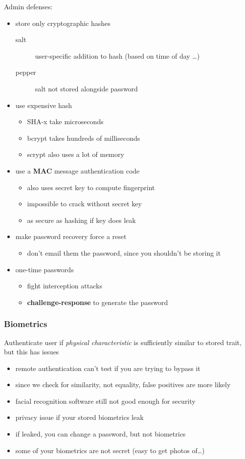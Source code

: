 \documentclass[]{article}
\theoremstyle{definition}
\begin{document}
	Admin defenses:
	\begin{itemize}
		\item store only cryptographic hashes
			\begin{description}
				\item[salt] user-specific addition to hash (based on time of day \dots)
				\item[pepper] salt not stored alongside password
			\end{description}
		\item use expensive hash
			\begin{itemize}
				\item SHA-x take microseconds
				\item bcrypt takes hundreds of milliseconds
				\item scrypt also uses a lot of memory
			\end{itemize}
		\item use a \textbf{MAC} message authentication code
			\begin{itemize}
				\item also uses secret key to compute fingerprint
				\item impossible to crack without secret key
				\item as secure as hashing if key does leak
			\end{itemize}
		\item make password recovery force a reset
			\begin{itemize}
				\item don't email them the password, since you shouldn't be storing it
			\end{itemize}
		\item one-time passwords
			\begin{itemize}
				\item fight interception attacks 
				\item \textbf{challenge-response} to generate the password
			\end{itemize}
	\end{itemize}

	\subsubsection{Biometrics}
	Authenticate user if \textit{physical characteristic} is sufficiently similar to stored trait, but this has issues
	\begin{itemize}
		\item remote authentication can't test if you are trying to bypass it
		\item since we check for similarity, not equality, false positives are more likely
		\item facial recognition software still not good enough for security
		\item privacy issue if your stored biometrics leak
		\item if leaked, you can change a password, but not biometrics
		\item some of your biometrics are not secret (easy to get photos of\dots)
	\end{itemize}
\end{document}
